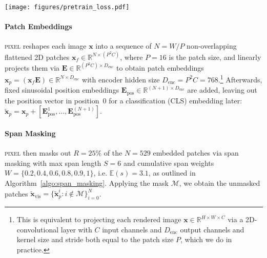 \documentclass{article}
\newcommand{\model}{\textsc{pixel}\xspace}
\begin{document}
\begin{figure*}[t]
    \centering
    \texttt{[image: figures/pretrain\_loss.pdf]}
    \caption{\model pretraining loss curve}
    \label{fig:training_loss}
\end{figure*}

\paragraph{Patch Embeddings} \model reshapes each image $\bm{x}$ into a sequence of $N=W/P$ non-overlapping flattened 2D patches ${\bm{x}_f\in \mathbb{R}^{N \times (P^2C)}}$, where $P=16$ is the patch size, and linearly projects them via ${\bm{E} \in \mathbb{R}^{(P^2C) \times D_{\text{enc}}}}$ to obtain patch embeddings $\bm{x}_p=(\bm{x}_f\bm{E}) \in \mathbb{R}^{N \times D_{\text{enc}}}$ with encoder hidden size ${D_{\text{enc}}=P^2C=768}$.\footnote{This is equivalent to projecting each rendered image $\bm{x} \in \mathbb{R}^{H \times W \times C}$ via a 2D-convolutional layer with $C$ input channels and $D_{\text{enc}}$ output channels and kernel size and stride both equal to the patch size $P$, which we do in practice.} Afterwards, fixed sinusoidal position embeddings $\bm{E}_{\text{pos}} \in \mathbb{R}^{(N + 1) \times D_{\text{enc}}}$ are added, leaving out the position vector in position~0 for a classification (CLS) embedding later: $\bm{\tilde{x}}_p=\bm{x}_p + [\bm{E}_{\text{pos}}^1, \ldots, \bm{E}_{\text{pos}}^{(N+1)}]$.

\paragraph{Span Masking} \model then masks out ${R=25\%}$ of the $N=529$ embedded patches via span masking with max span length $S=6$ and cumulative span weights $W=\{0.2,0.4,0.6,0.8,0.9,1\}$, i.e. $\mathbb{E}(s)=3.1$, as outlined in Algorithm~\ref{algo:span_masking}. Applying the mask $\mathcal{M}$, we obtain the unmasked patches ${\bm{\tilde{x}}_{\text{vis}} = \{ \bm{\tilde{x}}_p^{i} : i \notin \mathcal{M}\}_{i=0}^N}$.
\end{document}
